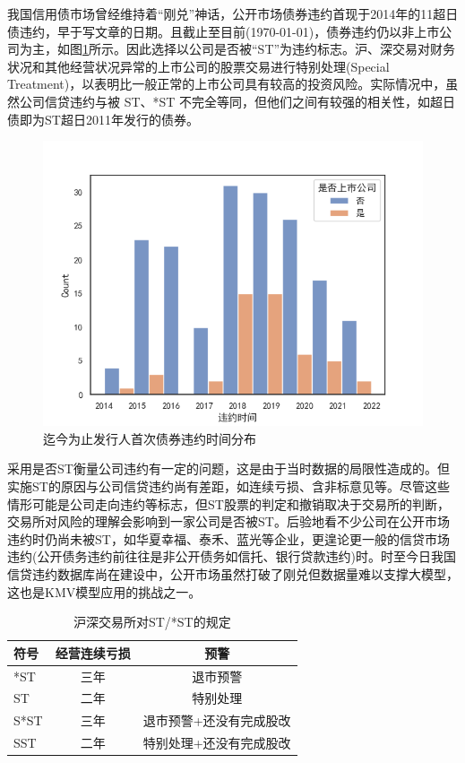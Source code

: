 \documentclass[a4paper,12pt]{ctexart}
\begin{document}
我国信用债市场曾经维持着“刚兑”神话，公开市场债券违约首现于2014年的11超日债违约，早于\citet{彭伟2012基于}写文章的日期。且截止至目前(\today)，债券违约仍以非上市公司为主，如图\ref{fig:default}所示。因此\citet{彭伟2012基于}选择以公司是否被“ST”为违约标志。沪、深交易对财务状况和其他经营状况异常的上市公司的股票交易进行特别处理(Special Treatment)，以表明比一般正常的上市公司具有较高的投资风险。实际情况中，虽然公司信贷违约与被 ST、*ST 不完全等同，但他们之间有较强的相关性，如超日债即为ST超日2011年发行的债券。
\begin{figure}[H]
    \centering
    \includegraphics[width=\linewidth]{img/发行人首次债券违约.png}
    \caption{迄今为止发行人首次债券违约时间分布}\label{fig:default}
\end{figure}

采用是否ST衡量公司违约有一定的问题，这是由于当时数据的局限性造成的。但实施ST的原因与公司信贷违约尚有差距，如连续亏损、含非标意见等。尽管这些情形可能是公司走向违约等标志，但ST股票的判定和撤销取决于交易所的判断，交易所对风险的理解会影响到一家公司是否被ST。后验地看不少公司在公开市场违约时仍尚未被ST，如华夏幸福、泰禾、蓝光等企业，更遑论更一般的信贷市场违约(公开债务违约前往往是非公开债务如信托、银行贷款违约)时。时至今日我国信贷违约数据库尚在建设中，公开市场虽然打破了刚兑但数据量难以支撑大模型，这也是KMV模型应用的挑战之一。
\begin{table}[H]
    \centering
    \begin{tabular}{lcc}
        \toprule
        符号   & 经营连续亏损 & 预警           \\
        \midrule
        *ST  & 三年     & 退市预警         \\
        ST   & 二年     & 特别处理         \\
        S*ST & 三年     & 退市预警+还没有完成股改 \\
        SST  & 二年     & 特别处理+还没有完成股改 \\
        \bottomrule
    \end{tabular}
    \caption{沪深交易所对ST/*ST的规定}
\end{table}
\end{document}
